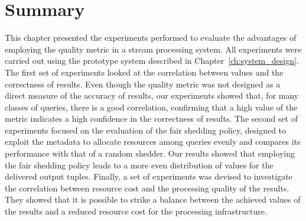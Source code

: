 \section{Summary}

This chapter presented the experiments performed to evaluate the advantages of employing the \sic quality
metric in a stream processing system. All experiments were carried out using the \sys prototype
system described in Chapter~\ref{ch:system_design}.  
The first set of experiments looked at the correlation between \sic values and the correctness of
results.
Even though the \sic quality metric was not designed as a direct measure of the accuracy of results,
our experiments showed that, for many classes of queries, there is a good correlation, confirming that a
high value of the \sic metric indicates a high confidence in the correctness of results.
The second set of experiments focused on the evaluation of the fair shedding policy, designed to
exploit the \sic metadata to allocate resources among queries evenly and compares its performance with
that of a random shedder. Our results showed that employing the fair shedding policy leads to a more even
distribution of \sic values for the delivered output tuples.
Finally, a set of experiments was devised to investigate the correlation between resource cost and
the processing quality of the results. 
They showed that it is possible to strike a balance between the achieved \sic values
of the results and a reduced resource cost for the processing infrastructure.
